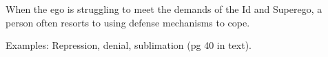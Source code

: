 \begin{coloredlist}
    \item When the ego is struggling to meet the demands of the Id and Superego, a person often resorts to using defense mechanisms to cope.
    \item Examples: Repression, denial, sublimation (pg 40 in text).
\end{coloredlist}